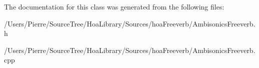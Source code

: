 The documentation for this class was generated from the following files\-:\begin{DoxyCompactItemize}
\item 
/\-Users/\-Pierre/\-Source\-Tree/\-Hoa\-Library/\-Sources/hoa\-Freeverb/Ambisonics\-Freeverb.\-h\item 
/\-Users/\-Pierre/\-Source\-Tree/\-Hoa\-Library/\-Sources/hoa\-Freeverb/Ambisonics\-Freeverb.\-cpp\end{DoxyCompactItemize}
